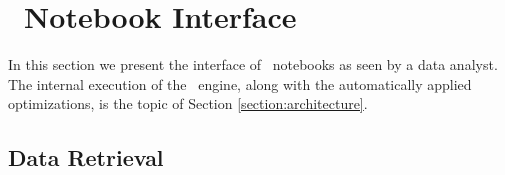 \section{\projname\ Notebook Interface}
\label{section:programming-model}

In this section we present the interface of \projname\ notebooks as seen by a data analyst. The internal execution of the \projname\ engine, along with the automatically applied optimizations, is the topic of Section \ref{section:architecture}.  \\ 


\subsection{Data Retrieval}
\label{section:dataretrieval}

